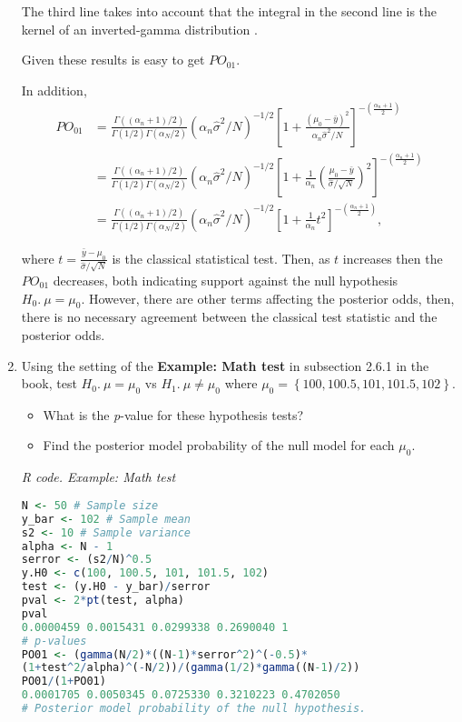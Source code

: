 \begin{enumerate}[leftmargin=*]
The third line takes into account that the integral in the second line is the kernel of an inverted-gamma distribution \cite{zellner1996introduction}.

Given these results is easy to get $PO_{01}$.

In addition, 
\begin{align*}
	PO_{01}&=\frac{\Gamma((\alpha_n+1)/2)}{\Gamma(1/2)\Gamma(\alpha_N/2)}(\alpha_n\hat{\sigma}^2/N)^{-1/2}\left[1+\frac{(\mu_0-\bar{y})^2}{\alpha_n\hat{\sigma}^2/N}\right]^{-\left(\frac{\alpha_n+1}{2}\right)}\\
	&=\frac{\Gamma((\alpha_n+1)/2)}{\Gamma(1/2)\Gamma(\alpha_N/2)}(\alpha_n\hat{\sigma}^2/N)^{-1/2}\left[1+\frac{1}{\alpha_n}\left(\frac{\mu_0-\bar{y}}{\hat{\sigma}/\sqrt{N}}\right)^2\right]^{-\left(\frac{\alpha_n+1}{2}\right)}\\
		&=\frac{\Gamma((\alpha_n+1)/2)}{\Gamma(1/2)\Gamma(\alpha_N/2)}(\alpha_n\hat{\sigma}^2/N)^{-1/2}\left[1+\frac{1}{\alpha_n}t^2\right]^{-\left(\frac{\alpha_n+1}{2}\right)},	
\end{align*}

where $t=\frac{\bar{y}-\mu_0}{\hat{\sigma}/\sqrt{N}}$ is the classical statistical test. Then, as $t$ increases then the $PO_{01}$ decreases, both indicating support against the null hypothesis $H_0. \ \mu=\mu_0$. However, there are other terms affecting the posterior odds, then, there is no necessary agreement between the classical test statistic and the posterior odds.  

\item Using the setting of the \textbf{Example: Math test} in subsection 2.6.1 in the book, test $H_0. \ \mu=\mu_0$ vs $H_1. \ \mu \neq \mu_0$ where $\mu_0=\left\{100, 100.5, 101, 101.5, 102 \right\}$.

\begin{itemize}
	\item What is the \textit{p}-value for these hypothesis tests?
	\item Find the posterior model probability of the null model for each $\mu_0$.
\end{itemize} 


\begin{tcolorbox}[enhanced,width=4.67in,center upper,
	fontupper=\large\bfseries,drop shadow southwest,sharp corners]
	\textit{R code. Example: Math test}
\begin{VF}
\begin{lstlisting}[basicstyle=\scriptsize, language=R]
N <- 50 # Sample size
y_bar <- 102 # Sample mean 
s2 <- 10 # Sample variance
alpha <- N - 1
serror <- (s2/N)^0.5 
y.H0 <- c(100, 100.5, 101, 101.5, 102)
test <- (y.H0 - y_bar)/serror
pval <- 2*pt(test, alpha)
pval
0.0000459 0.0015431 0.0299338 0.2690040 1
# p-values
PO01 <- (gamma(N/2)*((N-1)*serror^2)^(-0.5)*
(1+test^2/alpha)^(-N/2))/(gamma(1/2)*gamma((N-1)/2))
PO01/(1+PO01)
0.0001705 0.0050345 0.0725330 0.3210223 0.4702050
# Posterior model probability of the null hypothesis.

\end{lstlisting}
\end{VF}
\end{tcolorbox}

	
\end{enumerate}